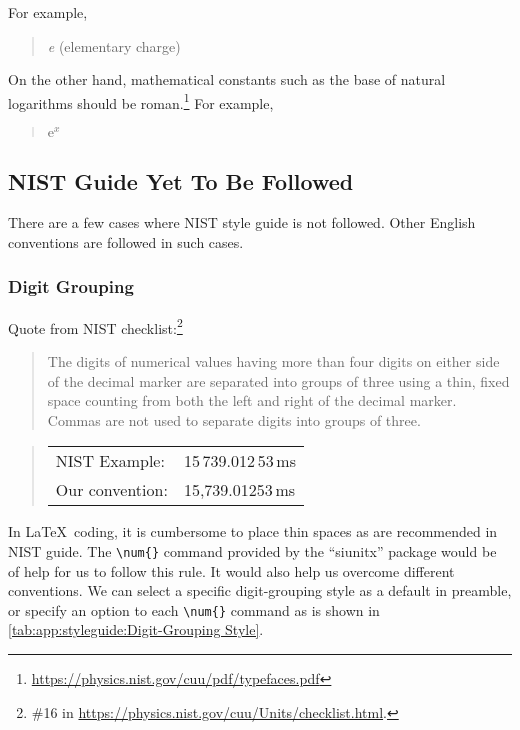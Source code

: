 For example,
\begin{quote}
  {\textit e} (elementary charge)
\end{quote}

On the other hand, mathematical constants such as the base
of natural logarithms should be roman.\footnote{
  \url{https://physics.nist.gov/cuu/pdf/typefaces.pdf}
}
For example,

\begin{quote}
  $\mathrm{e}^x$
\end{quote}


\subsection{NIST Guide Yet To Be Followed}
\label{sec:app:styleguide:NIST Guides Yet To Be Followed}

There are a few cases where NIST style guide is not followed.
Other English conventions are followed in such cases.

\subsubsection{Digit Grouping}
\label{sec:app:styleguide:Digit Grouping}

Quote from NIST checklist:\footnote{
  \#16 in \url{https://physics.nist.gov/cuu/Units/checklist.html}.
}

\begin{quote}
  The digits of numerical values having more than four digits on either
  side of the decimal marker are separated into groups of three using
  a thin, fixed space counting from both the left and right of the decimal
  marker.
  Commas are not used to separate digits into groups of three.
\end{quote}

\begin{quote}
\begin{tabular}{ll}
  NIST Example:& 15\,739.012\,53\,ms\\
  Our convention:& 15,739.01253\,ms\\
\end{tabular}
\end{quote}

In \LaTeX\ coding, it is cumbersome to place thin spaces as are recommended
in NIST guide.
The \verb|\num{}| command provided by the ``siunitx'' package would be
of help for us to follow this rule.
It would also help us overcome different conventions.
We can select a specific digit-grouping style as
a default in preamble, or specify an option to each \verb|\num{}|
command as is shown in
\cref{tab:app:styleguide:Digit-Grouping Style}.

